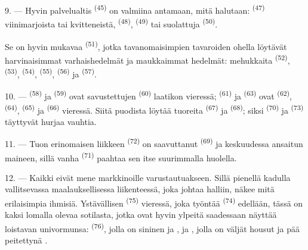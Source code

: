 9. --- Hyvin palvelualtis 
\textsuperscript{(45)} on valmiina antamaan, mitä halutaan: 
\textsuperscript{(47)} viinimarjoista tai kvitteneistä, 
\textsuperscript{(48)},  \textsuperscript{(49)} tai
suolattuja  \textsuperscript{(50)}.

Se on hyvin mukavaa  \textsuperscript{(51)}, jotka
tavanomaisimpien tavaroiden ohella löytävät harvinaisimmat varhaishedelmät ja
maukkaimmat hedelmät: mehukkaita  \textsuperscript{(52)},
 \textsuperscript{(53)}, 
\textsuperscript{(54)},  \textsuperscript{(55)},
 \textsuperscript{(56)} ja 
\textsuperscript{(57)}.

\VUsaut{4.0mm}
\VUsaut{3.0mm}

10. ---  \textsuperscript{(58)} ja 
\textsuperscript{(59)} ovat savustettujen 
\textsuperscript{(60)} laatikon vieressä; 
\textsuperscript{(61)} ja  \textsuperscript{(63)} ovat
 \textsuperscript{(62)}, 
\textsuperscript{(64)},  \textsuperscript{(65)} ja
 \textsuperscript{(66)} vieressä. Siitä puodista
löytää tuoreita  \textsuperscript{(67)} ja 
\textsuperscript{(68)}; siksi  \textsuperscript{(70)} ja
 \textsuperscript{(73)} täyttyvät hurjaa vauhtia.

11. --- Tuon erinomaisen liikkeen  \textsuperscript{(72)} on
saavuttanut  \textsuperscript{(69)} ja
 keskuudessa ansaitun maineen, sillä vanha
 \textsuperscript{(71)} paahtaa sen itse
suurimmalla huolella.

\VUsaut{4.0mm}
\VUsaut{3.0mm}

12. --- Kaikki eivät mene markkinoille varustautuakseen. Sillä pienellä kadulla
vallitsevassa maalauksellisessa liikenteessä, joka johtaa halliin, näkee mitä
erilaisimpia ihmisiä. Ystävällisen 
\textsuperscript{(75)} vieressä, joka työntää 
\textsuperscript{(74)} edellään, tässä on kaksi lomalla olevaa sotilasta, jotka
ovat hyvin ylpeitä saadessaan näyttää loistavan univormunsa:
 \textsuperscript{(76)}, jolla on sininen  ja
, ja , jolla on väljät
housut ja pää peitettynä .

